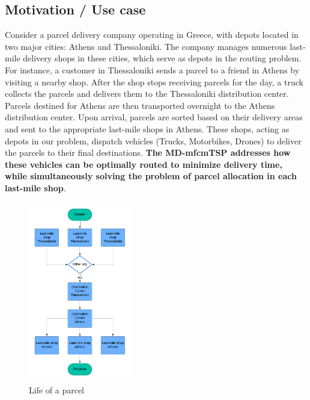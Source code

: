 \documentclass{article}
\begin{document}
	\subsection{Motivation / Use case}
	Consider a parcel delivery company operating in Greece, with depots located in two major cities: Athens and Thessaloniki. The company manages numerous last-mile delivery shops in these cities, which serve as depots in the routing problem. For instance, a customer in Thessaloniki sends a parcel to a friend in Athens by visiting a nearby shop. After the shop stops receiving parcels for the day, a truck collects the parcels and delivers them to the Thessaloniki distribution center. Parcels destined for Athens are then transported overnight to the Athens distribution center.
	Upon arrival, parcels are sorted based on their delivery areas and sent to the appropriate last-mile shops in Athens. These shops, acting as depots in our problem, dispatch vehicles (Trucks, Motorbikes, Drones) to deliver the parcels to their final destinations. \textbf{The MD-mfcmTSP addresses how these vehicles can be optimally routed to minimize delivery time, while simultaneously solving the problem of parcel allocation in each last-mile shop}.
	\par
	\begin{figure}[h!]
		\caption{Life of a parcel}
		\centering
		\includegraphics[width=0.40\textwidth, height=0.50\textheight]{Parcel-Life}
	\end{figure}
	\newpage
\end{document}
